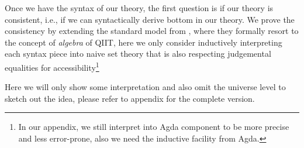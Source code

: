 Once we have the syntax of our theory, the first question is if our theory is consistent, i.e., if we can syntactically derive bottom in our theory. We prove the consistency by extending the standard model from \citep{kaposi2017type}, where they formally resort to the concept of \textit{algebra} of QIIT, here we only consider inductively interpreting each syntax piece into naive set theory that is also respecting judgemental equalities for accessibility\footnote{In our appendix, we still interpret into Agda component to be more precise and less error-prone, also we need the inductive facility from Agda.} 

Here we will only show some interpretation and also omit the universe level to sketch out the idea, please refer to appendix for the complete version.


\newcommand{\goodTypeS}[3]{{ {#1} \models_S {#2} }}
\newcommand{\goodTermS}[3]{{ {#1} \models_S {#2} : {#3} }}
\newcommand{\goodSubS}[3]{{ {#1} \models_S {#2} : {#3} }}
\newcommand{\goodSigS}[3]{{ {#1} \models_S {#2} \ \  Sig^{#3} }}
\newcommand{\goodWSigS}[3]{{ {#1} \models_S {#2} \ \ WSig^{#3} }}
\newcommand{\goodSealS}[4]{{ {#1} \models_S {#2} : {#3} \  |\  {#4} }}
\newcommand{\goodInhS}[4]{{ {#1} \models_S {#2} : {#3} \twoheadrightarrow {#4}}}

